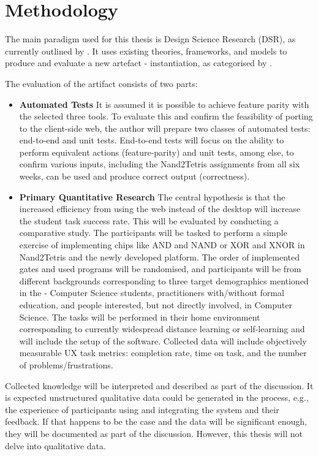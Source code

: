 \chapter{Methodology}


The main paradigm used for this thesis is Design Science Research (DSR), as currently outlined by \textcite{brocke2020designscience}.
It uses existing theories, frameworks, and models to produce and evaluate a new artefact - instantiation, as categorised by \textcite{hevner2004designscience}.

The evaluation of the artifact consists of two parts:

\begin{itemize}
    \item \textbf{Automated Tests}
    It is assumed it is possible to achieve feature parity with the selected three tools.
    To evaluate this and confirm the feasibility of porting to the client-side web, the author will prepare two classes of automated tests: end-to-end and unit tests.
    End-to-end tests will focus on the ability to perform equivalent actions (feature-parity) and unit tests, among else, to confirm various inputs, including the Nand2Tetris assignments from all six weeks, can be used and produce correct output (correctness).
    \item \textbf{Primary Quantitative Research}
    The central hypothesis is that the increased efficiency from using the web instead of the desktop will increase the student task success rate.
    This will be evaluated by conducting a comparative study.
    The participants will be tasked to perform a simple exercise of implementing chips like AND and NAND or XOR and XNOR in Nand2Tetris and the newly developed platform.
    The order of implemented gates and used programs will be randomised, and participants will be from different backgrounds corresponding to three target demographics mentioned in the  - Computer Science students, practitioners with/without formal education, and people interested, but not directly involved, in Computer Science.
    The tasks will be performed in their home environment corresponding to currently widespread distance learning or self-learning and will include the setup of the software.
    Collected data will include objectively measurable UX task metrics: completion rate, time on task, and the number of problems/frustrations.
\end{itemize}

Collected knowledge will be interpreted and described as part of the discussion.
It is expected unstructured qualitative data could be generated in the process, e.g., the experience of participants using and integrating the system and their feedback.
If that happens to be the case and the data will be significant enough, they will be documented as part of the discussion. However, this thesis will not delve into qualitative data.
